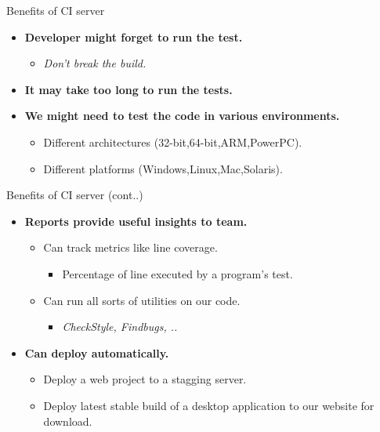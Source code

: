 \documentclass{beamer}
\begin{document}
\begin{frame}{Benefits of CI server}
\vspace{0.5cm}
 \begin{itemize}
\item \textbf{Developer might forget to run the test.}
\begin{itemize}
\vspace{0.5cm}
\item \textit{Don't break the build.}
\end{itemize}
\vspace{0.5cm}
\item \textbf{It may take too long to run the tests.}
\vspace{0.5cm}
\item \textbf{We might need to test the code in various environments.} 
\vspace{0.5cm}
\begin{itemize}
\item Different architectures (32-bit,64-bit,ARM,PowerPC).
\vspace{0.5cm}
\item Different platforms (Windows,Linux,Mac,Solaris).
\end{itemize}
\end{itemize}
\end{frame} 

\begin{frame}{Benefits of CI server (cont..)}
\vspace{0.5cm}
 \begin{itemize}
\item \textbf{Reports provide useful insights to team.}
\begin{itemize}
\vspace{0.5cm}
\item Can track metrics like line coverage.
\begin{itemize}
\vspace{0.5cm}
\item Percentage of line executed by a program's test.
\end{itemize}
\end{itemize}
\begin{itemize}
\vspace{0.5cm}
\item Can run all sorts of utilities on our code.
\begin{itemize}
\vspace{0.5cm}
\item \textit{CheckStyle, Findbugs, ..}
\end{itemize}
\end{itemize}
\item \textbf{Can deploy automatically.}
\vspace{0.5cm}
\begin{itemize}
\item Deploy a web project to a stagging server.
\vspace{0.5cm}
\item Deploy latest stable build of a desktop application to our website for download.
\end{itemize}
\end{itemize}
\end{frame} 
\end{document}
